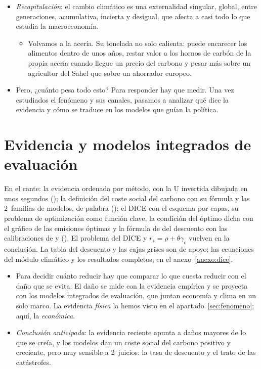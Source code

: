 \documentclass[11pt]{article}
\begin{document}
\begin{itemize}
\item \emph{Recapitulación}: el cambio climático es una externalidad singular, global, entre generaciones, acumulativa, incierta y desigual, que afecta a casi todo lo que estudia la macroeconomía.
  \begin{itemize}
  \item Volvamos a la acería. Su tonelada no solo calienta: puede encarecer los alimentos dentro de unos años, restar valor a los hornos de carbón de la propia acería cuando llegue un precio del carbono y pesar más sobre un agricultor del Sahel que sobre un ahorrador europeo.
  \end{itemize}
\item Pero, ¿cuánto pesa todo esto? Para responder hay que medir. Una vez estudiados el fenómeno y sus canales, pasamos a analizar qué dice la evidencia y cómo se traduce en los modelos que guían la política.
\end{itemize}


\section{Evidencia y modelos integrados de evaluación}\label{sec:evidencia-mie}

\begin{notaopositor}
En el cante: la evidencia ordenada por método, con la U invertida dibujada en unos segundos (); la definición del coste social del carbono con su fórmula y las 2~familias de modelos, de palabra (); el DICE con el esquema por capas, su problema de optimización como función clave, la condición del óptimo dicha con el gráfico de las emisiones óptimas y la fórmula de  del descuento con las calibraciones de  y  (). El problema del DICE y $r_s=\rho+\theta\gamma_c$ vuelven en la conclusión. La tabla del descuento y las cajas grises son de apoyo; las ecuaciones del módulo climático y los resultados completos, en el anexo~\ref{anexo:dice}.
\end{notaopositor}

\begin{itemize}
\item Para decidir cuánto reducir hay que comparar lo que cuesta reducir con el daño que se evita. El daño se mide con la evidencia empírica y se proyecta con los modelos integrados de evaluación, que juntan economía y clima en un solo marco. La evidencia \emph{física} la hemos visto en el apartado~\ref{sec:fenomeno}; aquí, la \emph{económica}.
\item \emph{Conclusión anticipada}: la evidencia reciente apunta a daños mayores de lo que se creía, y los modelos dan un coste social del carbono positivo y creciente, pero muy sensible a 2~juicios: la tasa de descuento y el trato de las catástrofes.
\end{itemize}
\end{document}

